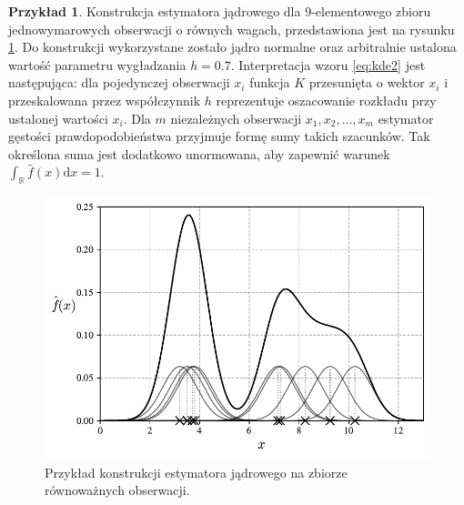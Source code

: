 \documentclass[12pt,a4paper,oneside]{book}
\theoremstyle{definition}
\newtheorem{exmp}{Przykład}[chapter]
\begin{document}
\begin{exmp} \label{exmp:kde_construction}
Konstrukcja estymatora jądrowego dla $9$-elementowego zbioru jednowymarowych obserwacji o równych wagach, przedstawiona jest na rysunku \ref{fig:kde_construction}. Do konstrukcji wykorzystane zostało jądro normalne oraz arbitralnie ustalona wartość parametru wygładzania $h = 0.7$. Interpretacja wzoru \eqref{eq:kde2} jest następująca: dla pojedynczej obserwacji $x_i$ funkcja $K$ przesunięta o wektor $x_i$ i przeskalowana przez współczynnik $h$ reprezentuje oszacowanie rozkładu przy ustalonej wartości $x_i$. Dla $m$ niezależnych obserwacji $x_1, x_2, ..., x_m$ estymator gęstości prawdopodobieństwa przyjmuje formę sumy takich szacunków. Tak określona suma jest dodatkowo unormowana, aby zapewnić warunek $\int_\mathbb{R} \hat{f}(x) \mathrm{d}x = 1$.
\begin{figure}[H]
    \centering
    \includegraphics[scale=0.65]{kde_construction}
    \vspace{-0.5cm} 
    \caption{Przykład konstrukcji estymatora jądrowego na zbiorze równoważnych obserwacji.}
    \label{fig:kde_construction}
\end{figure}
\end{exmp}
\end{document}
